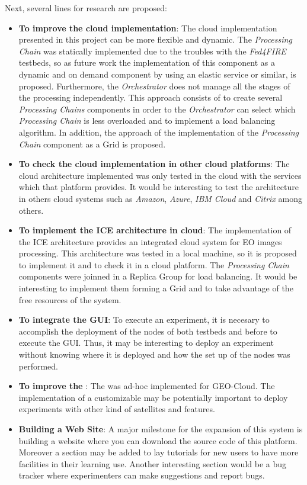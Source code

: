 Next, several lines for research are proposed:
\begin{itemize}
\item \textbf{To improve the cloud implementation}: The cloud implementation
  presented in this project can be more flexible and dynamic. The
  \emph{Processing Chain} was statically implemented due to the troubles with
  the \emph{Fed4FIRE} testbeds, so as future work the implementation of this
  component as a dynamic and on demand component by using an elastic service or
  similar, is proposed. Furthermore, the
  \emph{Orchestrator} does not manage all the stages of the processing
  independently. This approach consists of to create several \emph{Processing
    Chains} components in order to the \emph{Orchestrator} can select which
  \emph{Processing Chain} is less overloaded and to implement a load balancing algorithm. In
  addition, the approach of the implementation of the \emph{Processing Chain}
  component as a Grid is proposed.

\item \textbf{To check the cloud implementation in other cloud platforms}: The
  cloud architecture implemented was only tested in the \bonfire cloud with the
  services which that platform provides. It would be interesting to test the architecture
  in others cloud systems such as \emph{Amazon}, \emph{Azure}, \emph{IBM Cloud}
  and \emph{Citrix} among others. 

\item \textbf{To implement the ICE architecture in cloud}: The implementation of
  the ICE architecture provides an integrated cloud system for \ac{EO} images
  processing. This architecture was tested in a local machine, so it is proposed
  to implement it and to check it in a cloud platform. 
  The \emph{Processing Chain} components
  were joinned in a Replica Group for load balancing. It would be interesting to
  implement them forming a Grid and to take advantage of the free resources of
  the system.

\item \textbf{To integrate the \ac{GUI}}: To
  execute an experiment, it is necesary to accomplish the deployment of the nodes of both
  testbeds \bonfire and \vw before to execute the \ac{GUI}. Thus, it may be interesting
  to deploy an experiment without knowing where it is  deployed and how the set
  up of the nodes was performed.

\item \textbf{To improve the \sss}: The \sss was ad-hoc implemented for
  GEO-Cloud. The implementation of a customizable \sss may be potentially
  important to deploy experiments with other kind of satellites and features.

\item \textbf{Building a Web Site}: A major milestone for the expansion of this system
  is building a website where you can download the source code of this
  platform. Moreover a section may be added to lay tutorials for new users to have more facilities in their learning
  use. Another interesting section would be a bug tracker where experimenters can make
  suggestions and report bugs.

\end{itemize}

